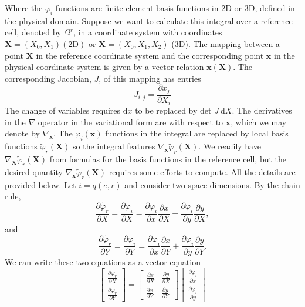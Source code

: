 \documentclass[../main.tex]{subfiles}
\begin{document}
		\noindent Where the $\varphi_{i}$ functions are finite element basis functions in $2 \mathrm{D}$ or $3 \mathrm{D}$, defined in the physical domain. Suppose we want to calculate this integral over a reference cell, denoted by $\Omega^{r}$, in a coordinate system with coordinates $\boldsymbol{X}=\left(X_{0}, X_{1}\right)(2 \mathrm{D})$ or $\boldsymbol{X}=\left(X_{0}, X_{1}, X_{2}\right)$ (3D). The mapping between a point $\boldsymbol{X}$ in the reference coordinate system and the corresponding point $\boldsymbol{x}$ in the physical coordinate system is given by a vector relation $\boldsymbol{x}(\boldsymbol{X})$. The corresponding Jacobian, $J$, of this mapping has entries
		$$
		J_{i, j}=\frac{\partial x_{j}}{\partial X_{i}}
		$$
		The change of variables requires $\mathrm{d} x$ to be replaced by det $J \mathrm{~d} X$. The derivatives in the $\nabla$ operator in the variational form are with respect to $\boldsymbol{x}$, which we may denote by $\nabla_{\boldsymbol{x}}$. The $\varphi_{i}(\boldsymbol{x})$ functions in the integral are replaced by local basis functions $\tilde{\varphi}_{r}(\boldsymbol{X})$ so the integral features $\nabla_{\boldsymbol{x}} \tilde{\varphi}_{r}(\boldsymbol{X})$. We readily have
		$\nabla_{\boldsymbol{X}} \tilde{\varphi}_{r}(\boldsymbol{X})$ from formulas for the basis functions in the reference cell, but the desired quantity $\nabla_{\boldsymbol{x}} \tilde{\varphi}_{r}(\boldsymbol{X})$ requires some efforts to compute. All the details are provided below.\smallbreak
		Let $i=q(e, r)$ and consider two space dimensions. By the chain rule,
		$$
		\frac{\partial \tilde{\varphi}_{r}}{\partial X}=\frac{\partial \varphi_{i}}{\partial X}=\frac{\partial \varphi_{i}}{\partial x} \frac{\partial x}{\partial X}+\frac{\partial \varphi_{i}}{\partial y} \frac{\partial y}{\partial X},
		$$
		and
		$$
		\frac{\partial \tilde{\varphi}_{r}}{\partial Y}=\frac{\partial \varphi_{i}}{\partial Y}=\frac{\partial \varphi_{i}}{\partial x} \frac{\partial x}{\partial Y}+\frac{\partial \varphi_{i}}{\partial y} \frac{\partial y}{\partial Y} .
		$$
		We can write these two equations as a vector equation
		$$
		\left[\begin{array}{l}
			\frac{\partial \bar{\varphi}_{r}}{\partial X} \\
			\frac{\partial \varphi_{r}}{\partial Y}
		\end{array}\right]=\left[\begin{array}{ll}
			\frac{\partial x}{\partial X} & \frac{\partial y}{\partial X} \\
			\frac{\partial x}{\partial Y} & \frac{\partial y}{\partial Y}
		\end{array}\right]\left[\begin{array}{l}
			\frac{\partial \varphi_{i}}{\partial x} \\
			\frac{\partial \varphi_{i}}{\partial y}
		\end{array}\right]
		$$
\end{document}
